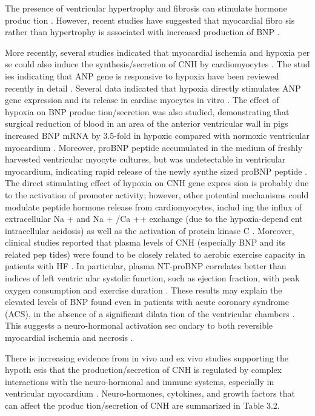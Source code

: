 \documentclass[14pt,a4paper,onecolumn]{extarticle}
\begin{document}
The presence of ventricular hypertrophy and fibrosis can stimulate hormone produc tion \citep{12}\citep{13}\citep{18-21}\citep{30}\citep{33-36}. However, recent studies have suggested that myocardial fibro sis rather than hypertrophy is associated with increased production of BNP \citep{24}\citep{35}\citep{36}.

More recently, several studies indicated that myocardial ischemia and hypoxia per se could also induce the synthesis/secretion of CNH by cardiomyocytes \citep{37-44}. The stud ies indicating that ANP gene is responsive to hypoxia have been reviewed recently in detail \citep{37}. Several data indicated that hypoxia directly stimulates ANP gene expression and its release in cardiac myocytes in vitro \citep{37}. The effect of hypoxia on BNP produc tion/secretion was also studied, demonstrating that surgical reduction of blood in an area of the anterior ventricular wall in pigs increased BNP mRNA by 3.5-fold in hypoxic compared with normoxic ventricular myocardium \citep{44}. Moreover, proBNP peptide accumulated in the medium of freshly harvested ventricular myocyte cultures, but was undetectable in ventricular myocardium, indicating rapid release of the newly synthe sized proBNP peptide \citep{44}. The direct stimulating effect of hypoxia on CNH gene expres sion is probably due to the activation of promoter activity; however, other potential mechanisms could modulate peptide hormone release from cardiomyocytes, includ ing the influx of extracellular Na + and Na + /Ca ++ exchange (due to the hypoxia-depend ent intracellular acidosis) as well as the activation of protein kinase C \citep{37}. Moreover, clinical studies reported that plasma levels of CNH (especially BNP and its related pep tides) were found to be closely related to aerobic exercise capacity in patients with HF \citep{45-47}. In particular, plasma NT-proBNP correlates better than indices of left ventric ular systolic function, such as ejection fraction, with peak oxygen consumption and exercise duration \citep{47}. These results may explain the elevated levels of BNP found even in patients with acute coronary syndrome (ACS), in the absence of a significant dilata tion of the ventricular chambers \citep{40}. This suggests a neuro-hormonal activation sec ondary to both reversible myocardial ischemia and necrosis \citep{41}.

There is increasing evidence from in vivo and ex vivo studies supporting the hypoth esis that the production/secretion of CNH is regulated by complex interactions with the neuro-hormonal and immune systems, especially in ventricular myocardium \citep{12}\citep{13}\citep{18}. Neuro-hormones, cytokines, and growth factors that can affect the produc tion/secretion of CNH are summarized in Table 3.2.
\end{document}
